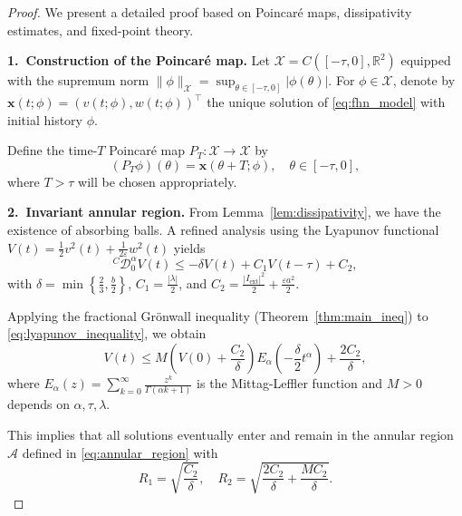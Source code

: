 \documentclass[12pt,a4paper]{article}
\numberwithin{equation}{section}
\begin{document}
\begin{proof}
	We present a detailed proof based on Poincaré maps, dissipativity estimates, and fixed-point theory.
	
	\noindent\textbf{1.~Construction of the Poincaré map.}
	Let $\mathcal{X} = C([-\tau,0], \mathbb{R}^2)$ equipped with the supremum norm $\|\phi\|_{\mathcal{X}} = \sup_{\theta \in [-\tau,0]} |\phi(\theta)|$. 
	For $\phi \in \mathcal{X}$, denote by $\mathbf{x}(t;\phi) = (v(t;\phi), w(t;\phi))^\top$ the unique solution of \eqref{eq:fhn_model} with initial history $\phi$.
	
	Define the time-$T$ Poincaré map $P_T: \mathcal{X} \to \mathcal{X}$ by
	\begin{equation}
		(P_T\phi)(\theta) = \mathbf{x}(\theta + T; \phi), \quad \theta \in [-\tau, 0],
		\label{eq:poincare_map_T}
	\end{equation}
	where $T > \tau$ will be chosen appropriately.
	
	\noindent\textbf{2.~Invariant annular region.}
	From Lemma~\ref{lem:dissipativity}, we have the existence of absorbing balls. 
	A refined analysis using the Lyapunov functional $V(t) = \frac{1}{2}v^2(t) + \frac{1}{2\varepsilon}w^2(t)$ yields
	\begin{equation}
		^{C}\mathcal{D}_0^\alpha V(t) \leq -\delta V(t) + C_1 V(t-\tau) + C_2,
		\label{eq:lyapunov_inequality}
	\end{equation}
	with $\delta = \min\left\{\frac{2}{3}, \frac{b}{2}\right\}$, $C_1 = \frac{|\lambda|}{2}$, and $C_2 = \frac{|I_{\text{ext}}|^2}{2} + \frac{\varepsilon a^2}{2}$.
	
	Applying the fractional Grönwall inequality (Theorem~\ref{thm:main_ineq}) to \eqref{eq:lyapunov_inequality}, we obtain
	\begin{equation}
		V(t) \leq M\left(V(0) + \frac{C_2}{\delta}\right) E_\alpha\left(-\frac{\delta}{2} t^\alpha\right) + \frac{2C_2}{\delta},
		\label{eq:lyapunov_bound}
	\end{equation}
	where $E_\alpha(z) = \sum_{k=0}^\infty \frac{z^k}{\Gamma(\alpha k + 1)}$ is the Mittag-Leffler function and $M > 0$ depends on $\alpha, \tau, \lambda$.
	
	This implies that all solutions eventually enter and remain in the annular region $\mathcal{A}$ defined in \eqref{eq:annular_region} with
	\begin{equation}
		R_1 = \sqrt{\frac{C_2}{\delta}}, \quad R_2 = \sqrt{\frac{2C_2}{\delta} + \frac{M C_2}{\delta}}.
		\label{eq:radius_bounds}
	\end{equation}
	

\end{proof}
\end{document}

